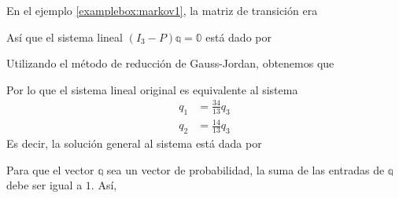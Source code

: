 \begin{examplebox}{}{}
    En el ejemplo \ref{examplebox:markov1}, la matriz de transición era
    \begin{matrizn}
    \end{matrizn}
    Así que el sistema lineal $(I_3 - P)\mathbb{q} = \mathbb{0}$ está dado por
    \begin{matrizn}
    \end{matrizn}
    Utilizando el método de reducción de Gauss-Jordan, obtenemos que
    \begin{nscenter}
    \end{nscenter}
    \newpage
    Por lo que el sistema lineal original es equivalente al sistema
    \begin{align*}
        q_1 & = \frac{34}{13} q_3 \\
        q_2 & = \frac{14}{13} q_3
    \end{align*}
    Es decir, la solución general al sistema está dada por
    \begin{matrizn}
    \end{matrizn}
    Para que el vector $\mathbb{q}$ sea un vector de probabilidad, la suma de las entradas de $\mathbb{q}$ debe ser igual a $1$. Así,

\end{examplebox}
